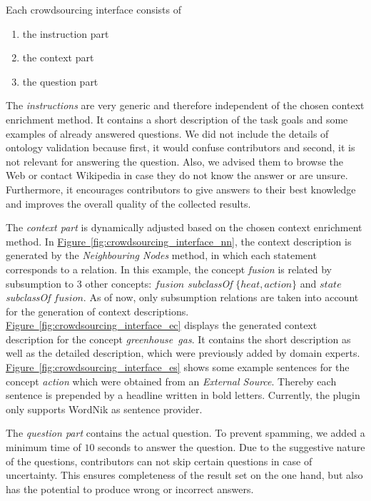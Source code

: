 Each crowdsourcing interface consists of
\begin{enumerate}
		\item the instruction part
		\item the context part
		\item the question part
\end{enumerate}

The \emph{instructions} are very generic and therefore independent of the chosen context enrichment method. It contains a short description of the task goals and some examples of already answered questions. We did not include the details of ontology validation because first, it would confuse contributors and second, it is not relevant for answering the question. Also, we advised them to browse the Web or contact Wikipedia in case they do not know the answer or are unsure. Furthermore, it encourages contributors to give answers to their best knowledge and improves the overall quality of the collected results.  

The \emph{context part} is dynamically adjusted based on the chosen context enrichment method.
In \hyperref[fig:crowdsourcing_interface_nn]{Figure~\ref*{fig:crowdsourcing_interface_nn}}, the context description is generated by the \emph{Neighbouring Nodes} method, in which each statement corresponds to a relation. In this example, the concept \emph{fusion} is related by subsumption to 3 other concepts: $ fusion$  \emph{subclassOf} $ \{ heat, action \} $ and $ state $ \emph{subclassOf} $ fusion $. As of now, only subsumption relations are taken into account for the generation of context descriptions. 
\hyperref[fig:crowdsourcing_interface_ec]{Figure~\ref*{fig:crowdsourcing_interface_ec}} displays the generated context description for the concept \emph{greenhouse~gas}. It contains the short description as well as the detailed description, which were previously added by domain experts.
\hyperref[fig:crowdsourcing_interface_es]{Figure~\ref*{fig:crowdsourcing_interface_es}} shows some example sentences for the concept \emph{action} which were obtained from an \emph{External Source}. Thereby each sentence is prepended by a headline written in bold letters. Currently, the plugin only supports WordNik as sentence provider. 

The \emph{question part} contains the actual question. To prevent spamming, we added a minimum time of $10$ seconds to answer the question. Due to the suggestive nature of the questions, contributors can not skip certain questions in case of uncertainty. This ensures completeness of the result set on the one hand, but also has the potential to produce wrong or incorrect answers. 

